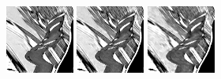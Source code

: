 \documentclass[10pt, journal, twocolumn, final, a4paper]{IEEEtran}
\begin{document}
\begin{figure}[thpb!]
\begin{center}
		               \hspace{0.2\textwidth}%
		\includegraphics[width=0.2\textwidth]{figs/temporal_slices/slice_mobile_mono_vnlb_pt4_s10_row220_col040-180_fra080-220.png}%
		\includegraphics[width=0.2\textwidth]{figs/temporal_slices/slice_mobile_mono_vnlb_pt4_s20_row220_col040-180_fra080-220.png}%
		\includegraphics[width=0.2\textwidth]{figs/temporal_slices/slice_mobile_mono_vnlb_pt4_s40_row220_col040-180_fra080-220.png}\\

\end{center}
\end{figure}
\end{document}
